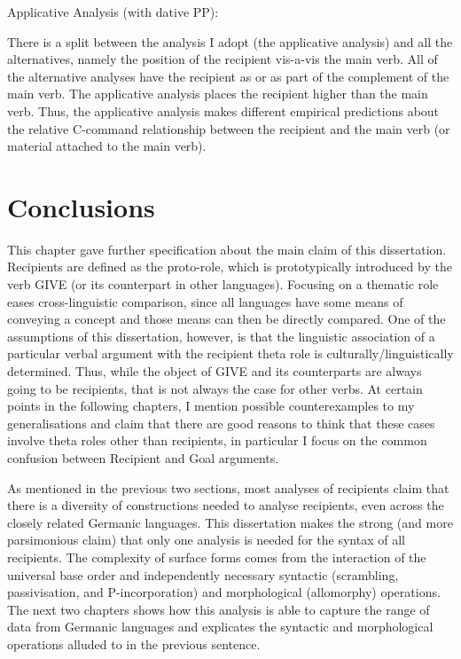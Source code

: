 \begin{exe}
	\ex Applicative Analysis (with dative PP):\\
\end{exe}

There is a split between the analysis I adopt (the applicative analysis) and all the alternatives, namely the position of the recipient vis-a-vis the main verb. All of the alternative analyses have the recipient as or as part of the complement of the main verb. The applicative analysis places the recipient higher than the main verb. Thus, the applicative analysis makes different empirical predictions about the relative C-command relationship between the recipient and the main verb (or material attached to the main verb).

\section{Conclusions}
This chapter gave further specification about the main claim of this dissertation. Recipients are defined as the proto-role, which is prototypically introduced by the verb GIVE (or its counterpart in other languages). Focusing on a thematic role eases cross-linguistic comparison, since all languages have some means of conveying a concept and those means can then be directly compared. One of the assumptions of this dissertation, however, is that the linguistic association of a particular verbal argument with the recipient theta role is culturally/linguistically determined. Thus, while the object of GIVE and its counterparts are always going to be recipients, that is not always the case for other verbs. At certain points in the following chapters, I mention possible counterexamples to my generalisations and claim that there are good reasons to think that these cases involve theta roles other than recipients, in particular I focus on the common confusion between Recipient and Goal arguments.

As mentioned in the previous two sections, most analyses of recipients claim that there is a diversity of constructions needed to analyse recipients, even across the closely related Germanic languages. This dissertation makes the strong (and more parsimonious claim) that only one analysis is needed for the syntax of all recipients. The complexity of surface forms comes from the interaction of the universal base order and independently necessary syntactic (scrambling, passivisation, and P-incorporation) and morphological (allomorphy) operations. The next two chapters shows how this analysis is able to capture the range of data from Germanic languages and explicates the syntactic and morphological operations alluded to in the previous sentence.

%

